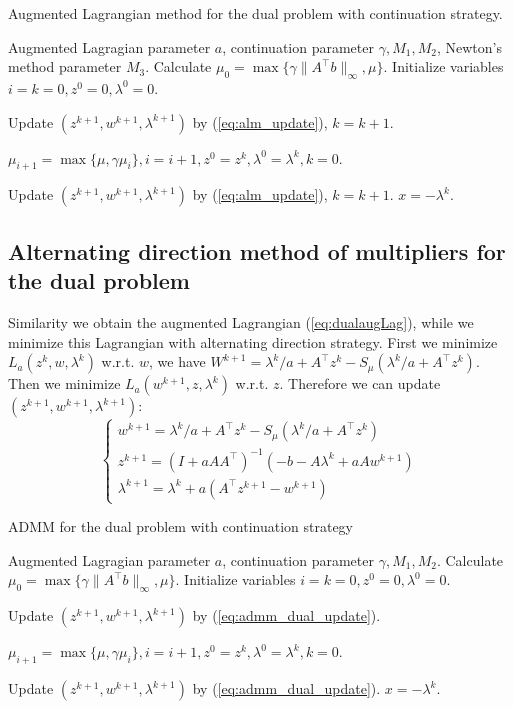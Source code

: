 \documentclass{article}
\numberwithin{equation}{section}
\numberwithin{figure}{section}
\begin{document}
\begin{algorithm}[!htbp]\caption{Augmented Lagrangian method for the dual problem with continuation strategy.}\label{alg:alm}
\begin{algorithmic}[1]
 Augmented Lagragian parameter $a$, continuation parameter $\gamma, M_1, M_2$, Newton's method parameter $M_3$.
Calculate $\mu_0=\max\{\gamma\|A^\top b\|_\infty,\mu\}$. Initialize variables $i=k=0,z^0=0,\lambda^0=0$.
\item Update $(z^{k+1},w^{k+1},\lambda^{k+1})$ by (\ref{eq:alm_update}), $k = k+1$.
\ENDFOR
\item $\mu_{i+1}=\max\{\mu, \gamma\mu_i\}, i =i+1,z^0=z^k,\lambda^0=\lambda^k,k=0$.
\ENDWHILE
{}
\item Update $(z^{k+1},w^{k+1},\lambda^{k+1})$ by (\ref{eq:alm_update}), $k = k+1$.
\ENDFOR
\STATE $x=-\lambda^k$.
\end{algorithmic}
\end{algorithm}
\subsection{Alternating direction method of multipliers for the dual problem}
Similarity we obtain the augmented Lagrangian (\ref{eq:dualaugLag}), while we minimize this Lagrangian with alternating direction strategy. First we minimize $L_a(z^k,w,\lambda^k)$ w.r.t. $w$, we have
$W^{k+1}=\lambda^k/a+A^\top z^{k}-S_{\mu}(\lambda^k/a+A^\top z^{k})$. Then we minimize $L_a(w^{k+1},z,\lambda^k)$ w.r.t. $z$. Therefore we can update $(z^{k+1},w^{k+1},\lambda^{k+1})$:
\begin{equation}
\label{eq:admm_dual_update}
    \begin{cases}
    w^{k+1}=\lambda^k/a+A^\top z^{k}-S_{\mu}(\lambda^k/a+A^\top z^{k})\\
    z^{k+1}=(I+aAA^\top)^{-1}(-b-A\lambda^k+aAw^{k+1})\\
    \lambda^{k+1}=\lambda^k+a(A^\top z^{k+1}-w^{k+1})
    \end{cases}
\end{equation}

\begin{algorithm}[!htbp]\caption{ADMM for the dual problem with continuation strategy}\label{alg:alm}
\begin{algorithmic}[1]
 Augmented Lagragian parameter $a$, continuation parameter $\gamma, M_1, M_2$.
Calculate $\mu_0=\max\{\gamma\|A^\top b\|_\infty,\mu\}$. Initialize variables $i=k=0,z^0=0,\lambda^0=0$.
\item Update $(z^{k+1},w^{k+1},\lambda^{k+1})$ by (\ref{eq:admm_dual_update}).
\ENDFOR
\item $\mu_{i+1}=\max\{\mu, \gamma\mu_i\}, i =i+1, z^0=z^k,\lambda^0=\lambda^k,k=0$.
\ENDWHILE
{}
\item Update $(z^{k+1},w^{k+1},\lambda^{k+1})$ by (\ref{eq:admm_dual_update}).
\ENDFOR
\STATE $x=-\lambda^k$.
\end{algorithmic}
\end{algorithm}
\end{document}
